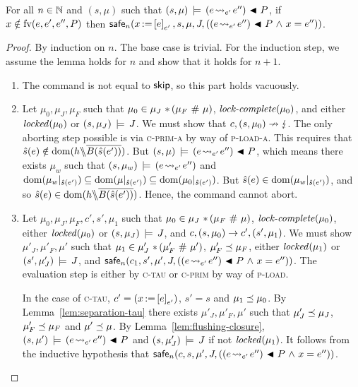 \documentclass[11pt]{report}
\begin{document}
\begin{lemma}
	\label{lem:load-safe}
	For all $n \in \mathbb{N}$ and $(s,\mu)$ such that $(s,\mu) \,\models\, (e \!\leadsto_{e'}\! e'') \operatorname{\,\blacktriangleleft\,} P$, if $x \notin \mathrm{fv}(e,e',e'',P)$ then $\mathsf{safe}_{n}(x \operatorname{:\!=} \left[ e \right]_{e'},s,\mu,J,\left((e \!\leadsto_{e'}\! e'') \operatorname{\,\blacktriangleleft\,} P \operatorname{\,\wedge\,} x = e''\right))$. 
\end{lemma}

\begin{proof}
	By induction on $n$. The base case is trivial. For the induction step, we assume the lemma holds for $n$ and show that it holds for $n+1$.

	\begin{enumerate}
		\item The command is not equal to $\operatorname{\mathsf{skip}}$, so this part holds vacuously. 

		\item Let $\mu_0,\mu_J,\mu_F$ such that $\mu_0 \in \mu_J \operatorname{\,\ast\,} (\mu_F \operatorname{\,\#\,} \mu)$, $\text{\textit{lock-complete}}(\mu_0)$, and either $\mathit{locked}(\mu_0)$ or $(s,\mu_J) \,\models\, J$. We must show that $c,(s,\mu_0) \nrightarrow \lightning$. The only aborting step possible is via \textsc{c-prim-a} by way of \textsc{p-load-a}. This requires that $\hat{s}(e) \notin \operatorname{\mathrm{dom}}(h \backslash\!\!\backslash \overline{B(\hat{s}(e'))})$. But $(s,\mu) \,\models\, (e \!\leadsto_{e'}\! e'') \operatorname{\,\blacktriangleleft\,} P$, which means there exists $\mu_w$ such that $(s,\mu_w) \,\models\, (e \!\leadsto_{e'}\! e'')$ and $\operatorname{\mathrm{dom}}(\mu_w |_{\hat{s}(e')}) \subseteq \operatorname{\mathrm{dom}}(\mu |_{\hat{s}(e')}) \subseteq \operatorname{\mathrm{dom}}(\mu_0 |_{\hat{s}(e')})$. But $\hat{s}(e) \in \operatorname{\mathrm{dom}}(\mu_w |_{\hat{s}(e')})$, and so $\hat{s}(e) \in \operatorname{\mathrm{dom}}(h \backslash\!\!\backslash \overline{B(\hat{s}(e'))})$. Hence, the command cannot abort. 

		\item Let $\mu_0,\mu_J,\mu_F,c',s',\mu_1$ such that $\mu_0 \in \mu_J \operatorname{\,\ast\,} (\mu_F \operatorname{\,\#\,} \mu)$, $\text{\textit{lock-complete}}(\mu_0)$, either $\mathit{locked}(\mu_0)$ or $(s,\mu_J) \,\models\, J$, and $c,(s,\mu_0) \rightarrow c',(s',\mu_1)$. We must show $\mu'_J,\mu'_F,\mu'$ such that $\mu_1 \in \mu'_J \operatorname{\,\ast\,} (\mu'_F \operatorname{\,\#\,} \mu')$, $\mu'_F \preceq \mu_F$, either $\mathit{locked}(\mu_1)$ or $(s',\mu'_J) \,\models\, J$, and $\mathsf{safe}_{n}(c_1,s',\mu',J,((e \!\leadsto_{e'}\! e'') \operatorname{\,\blacktriangleleft\,} P \operatorname{\,\wedge\,} x = e''))$. The evaluation step is either by \textsc{c-tau} or \textsc{c-prim} by way of \textsc{p-load}. 

		In the case of \textsc{c-tau}, $c' = (x \operatorname{:\!=} \left[ e \right]_{e'})$, $s' = s$ and $\mu_1 \preceq \mu_0$. By Lemma~\ref{lem:separation-tau} there exists $\mu'_J,\mu'_F,\mu'$ such that $\mu'_J \preceq \mu_J$, $\mu'_F \preceq \mu_F$ and $\mu' \preceq \mu$. By Lemma~\ref{lem:flushing-closure}, $(s,\mu') \,\models\, (e \!\leadsto_{e'}\! e'') \operatorname{\,\blacktriangleleft\,} P$ and $(s,\mu'_J) \,\models\, J$ if not $\mathit{locked}(\mu_1)$. It follows from the inductive hypothesis that $\mathsf{safe}_{n}(c,s,\mu',J,((e \!\leadsto_{e'}\! e'') \operatorname{\,\blacktriangleleft\,} P \operatorname{\,\wedge\,} x = e''))$. 


\end{enumerate}
\end{proof}
\end{document}
